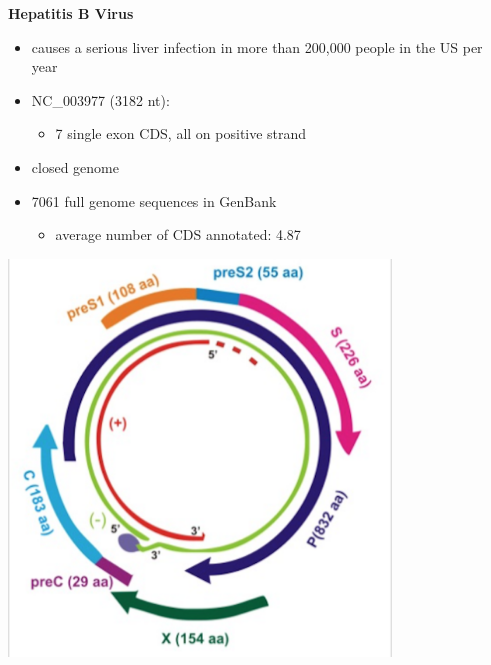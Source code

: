 \documentclass[landscape]{slides}
\begin{document}
\begin{slide}
\begin{center}
\textbf{Hepatitis B Virus}

\begin{minipage}[c]{6in}
\tiny
\begin{itemize}
\item causes a serious liver infection in more than 200,000 people in
  the US per year
\item NC\_003977 (3182 nt):
  \begin{itemize}
    \item 7 single exon CDS, all on positive strand
  \end{itemize}
\item closed genome
\item 7061 full genome sequences in GenBank
\begin{itemize}
  \item average number of CDS annotated: 4.87
\end{itemize}
\end{itemize}
\vspace{2in}
\end{minipage}
\begin{minipage}[c]{4in}
\includegraphics[width=4in]{figs/hbv-genome-small-lowres}
\tiny {}

\vspace{2in}
\end{minipage}

\vfill
\end{center}
\end{slide}
\end{document}

